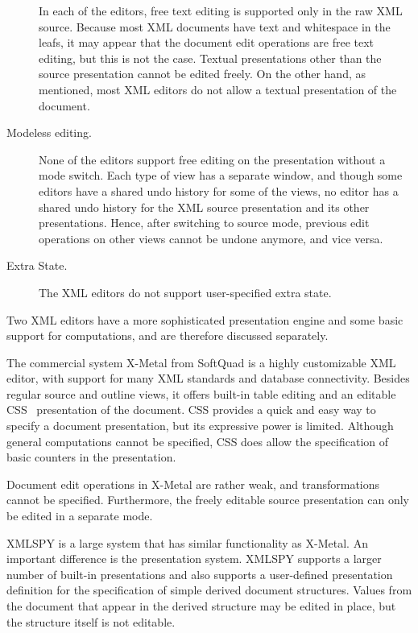 \begin{description}
In each of the editors, free text editing is supported only in the raw XML source. Because most XML documents have text and whitespace in the leafs, it may appear that the document edit operations are free text editing, but this is not the case. Textual presentations other than the source presentation cannot be edited freely. On the other hand, as mentioned, most XML editors do not allow a textual presentation of the document. 

\item[Modeless editing.]
None of the editors support free editing on the presentation without a mode switch. Each type of view has a separate window, and though some editors have a shared undo history for some of the views, no editor has a shared undo history for the XML source presentation and its other presentations. Hence, after switching to source mode, previous edit operations on other views cannot be undone anymore, and vice versa.

\item[Extra State.]
The XML editors do not support user-specified extra state.

\end{description}

Two XML editors have a more sophisticated presentation engine and some basic support for computations, and are therefore discussed separately.


The commercial system X-Metal from SoftQuad is a highly customizable XML editor, with support for many XML standards and database connectivity. Besides regular source and outline views, it offers built-in table editing and an editable CSS~\cite{css2} presentation of the document. CSS provides a quick and easy way to specify a document presentation, but its expressive power is limited. Although general computations cannot be specified, CSS does allow the specification of basic counters in the presentation. 

Document edit operations in X-Metal are rather weak, and transformations cannot be specified. Furthermore, the freely editable source presentation can only be edited in a separate mode.


XMLSPY is a large system that has similar functionality as X-Metal. An important difference is the presentation system. XMLSPY supports a larger number of built-in presentations and also supports a user-defined presentation definition for the specification of simple derived document structures. Values from the document that appear in the derived structure may be edited in place, but the structure itself is not editable.

